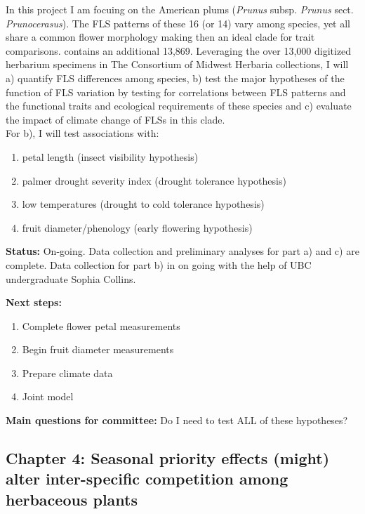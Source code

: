 \documentclass[11pt]{article}\usepackage[]{graphicx}\usepackage[]{color}
\begin{document}
In this project I am focuing on the American plums (\textit{Prunus} subsp. \textit{Prunus} sect. \textit{Prunocerasus}). The FLS patterns of these 16 (or 14) vary among species, yet all share a common flower morphology making then an ideal clade for trait comparisons. contains an additional 13,869. Leveraging the over 13,000 digitized herbarium specimens in The Consortium of Midwest Herbaria collections, I will a) quantify FLS differences among species, b) test the major hypotheses of the function of FLS variation by testing for correlations between FLS patterns and the functional traits and ecological requirements of these species and c) evaluate the impact of climate change of FLSs in this clade.\\

For b), I will test associations with:
\begin{enumerate}
\item petal length (insect visibility hypothesis)
\item palmer drought severity index (drought tolerance hypothesis)
\item low temperatures (drought to cold tolerance hypothesis)
\item fruit diameter/phenology (early flowering hypothesis)
\end{enumerate}

\textbf{Status:} On-going. Data collection and preliminary analyses for part a) and c) are complete. Data collection for part b) in on going with the help of UBC undergraduate Sophia Collins.

\textbf{Next steps:}
\begin{enumerate}
\item Complete flower petal measurements
\item Begin fruit diameter measurements
\item Prepare climate data
\item Joint model
\end{enumerate}

\textbf{Main questions for committee:} Do I need to test ALL of these hypotheses?

\subsection*{Chapter 4: Seasonal priority effects (might) alter inter-specific competition among herbaceous plants}
\end{document}
